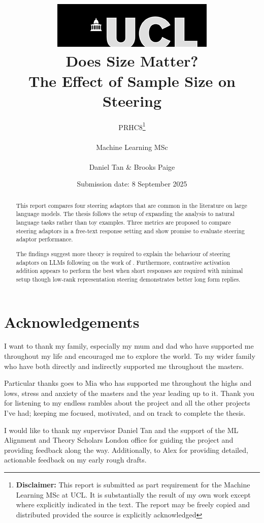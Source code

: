 \documentclass[tikz, 12pt]{report}
\title{{ \includegraphics[scale=.5]{figures/ucl_logo.png}}\\
{{\Huge Does Size Matter?}\\{\Large The Effect of Sample Size on Steering}}\\
}
\date{Submission date: 8 September 2025}
\author{PRHC8\thanks{
{\bf Disclaimer:}
This report is submitted as part requirement for the Machine Learning MSc at UCL. It is
substantially the result of my own work except where explicitly indicated in the text.
The report may be freely copied and distributed provided the source is explicitly acknowledged}
\\ \\
Machine Learning MSc\\ \\
Daniel Tan \& Brooks Paige}
\begin{document}




\onehalfspacing
\maketitle

\chapter*{Acknowledgements}

I want to thank my family, especially my mum and dad who have supported me throughout my life and encouraged me to explore the world.
To my wider family who have both directly and indirectly supported me throughout the masters.

Particular thanks goes to Mia who has supported me throughout the highs and lows, stress and anxiety of the masters and the year leading up to it.
Thank you for listening to my endless rambles about the project and all the other projects I've had; keeping me focused, motivated, and on track to complete the thesis.

I would like to thank my supervisor Daniel Tan and the support of the ML Alignment and Theory Scholars London office for guiding the project and providing feedback along the way.
Additionally, to Alex for providing detailed, actionable feedback on my early rough drafts.

\begin{abstract}
    This report compares four steering adaptors that are common in the literature on large language models.
    The thesis follows the setup of \citet{steering-clear} expanding the analysis to natural language tasks rather than toy examples.
    Three metrics are proposed to compare steering adaptors in a free-text response setting and show promise to evaluate steering adaptor performance.

    The findings suggest more theory is required to explain the behaviour of steering adaptors on LLMs following on the work of \citet{steering-clear}.
    Furthermore, contrastive activation addition \citep{caa} appears to perform the best when short responses are required with minimal setup though low-rank representation steering \citep{steering-clear} demonstrates better long form replies.
\end{abstract}

\tableofcontents
\listoffigures
\listoftables
\clearpage
{}









\appendix
{}





\end{document}
